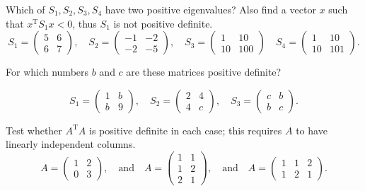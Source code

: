 \begin{problem}
Which of $S_1, S_2, S_3, S_4$ have two positive eigenvalues? Also find a vector $x$ such that $x^{\mathrm T} S_1 x < 0$, thus $S_1$ is not positive definite.
    $$
    S_1=\begin{pmatrix}
    5 & 6 \\
    6 & 7
    \end{pmatrix},\quad
    S_2=\begin{pmatrix}
    -1 & -2 \\
    -2 & -5
    \end{pmatrix},\quad
    S_3=\begin{pmatrix}
    1 & 10 \\
    10 & 100
    \end{pmatrix}\quad
    S_4=\begin{pmatrix}
    1 & 10 \\
    10 & 101
    \end{pmatrix}.
    $$
\end{problem}

\begin{problem}
    For which numbers $b$ and $c$ are these matrices positive definite?
    
    $$
    S_1=\begin{pmatrix}
    1 & b \\
    b & 9
    \end{pmatrix},\quad
    S_2=\begin{pmatrix}
    2 & 4 \\
    4 & c
    \end{pmatrix},\quad
    S_3=\begin{pmatrix}
    c & b \\
    b & c
    \end{pmatrix}.
    $$
\end{problem}

\begin{problem}
    Test whether $A^{\mathrm T}A$ is positive definite in each case; this requires $A$ to have linearly independent columns.
    $$
    A=\begin{pmatrix}
    1 & 2 \\
    0 & 3
    \end{pmatrix},
    \quad \text{and} \quad
    A=\begin{pmatrix}
    1 & 1 \\
    1 & 2 \\
    2 & 1
    \end{pmatrix},
    \quad \text{and} \quad
    A=\begin{pmatrix}
    1 & 1 & 2 \\
    1 & 2 & 1
    \end{pmatrix}.
    $$
\end{problem}